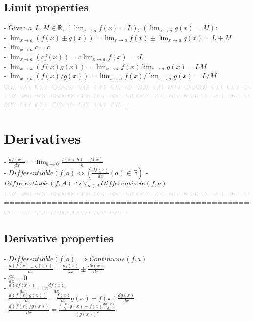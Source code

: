 \documentclass{book}
\begin{document}
\subsection{Limit properties}
	- Given $a, L, M \in \mathbb{R}$, $(\lim_{x \to a} f(x) = L)$, $(\lim_{x \to a} g(x) = M)$: \\
	- $\lim_{x \to a} (f(x) \pm g(x)) = \lim_{x \to a} f(x) \pm \lim_{x \to a} g(x) = L + M$ \\ %
	- $\lim_{x \to a} c = c$ \\ %
	- $\lim_{x \to a} (c f(x)) = c \lim_{x \to a} f(x) = c L$ \\ %
	- $\lim_{x \to a} (f(x) g(x)) = \lim_{x \to a} f(x) \lim_{x \to a} g(x) = L M$ \\ %
	- $\lim_{x \to a} (f(x) / g(x)) = \lim_{x \to a} f(x) / \lim_{x \to a} g(x) = L / M$ \\ %
	===================================================================================================================
\section{Derivatives}
	- $\frac{df(x)}{dx} = \lim_{h \rightarrow 0} \frac{f(x+h) - f(x)}{h}$ \\
	- $Differentiable(f, a) \iff (\frac{df(x)}{dx}(a) \in \mathbb{R})$
	- $Differentiable(f, A) \iff \forall_{a \in A} Differentiable(f, a)$ \\
	===================================================================================================================
\subsection{Derivative properties} %
	- $Differentiable(f, a) \implies Continuous(f, a)$ \\
	- $\frac{d(f(x) \pm g(x))}{dx} = \frac{df(x)}{dx} \pm \frac{dg(x)}{dx}$ \\
	- $\frac{dc}{dx} = 0$ \\
	- $\frac{d(c f(x))}{dx} = c \frac{df(x)}{dx}$ \\
	- $\frac{d(f(x) g(x))}{dx} = \frac{f(x)}{dx} g(x) + f(x) \frac{dg(x)}{dx}$ \\
	- $\frac{d(f(x) / g(x))}{dx} =  \frac{\frac{f(x)}{dx} g(x) - f(x) \frac{dg(x)}{dx}}{(g(x))^2}$ \\
	
\end{document}
